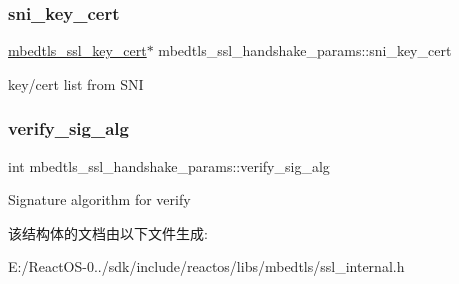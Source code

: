 \subsubsection{\texorpdfstring{sni\+\_\+key\+\_\+cert}{sni\_key\_cert}}
{\footnotesize\ttfamily \hyperlink{structmbedtls__ssl__key__cert}{mbedtls\+\_\+ssl\+\_\+key\+\_\+cert}$\ast$ mbedtls\+\_\+ssl\+\_\+handshake\+\_\+params\+::sni\+\_\+key\+\_\+cert}

key/cert list from S\+NI \mbox{\label{structmbedtls__ssl__handshake__params_ab950ce283cc477ea1a246689ecd2a22d}} 
\subsubsection{\texorpdfstring{verify\+\_\+sig\+\_\+alg}{verify\_sig\_alg}}
{\footnotesize\ttfamily int mbedtls\+\_\+ssl\+\_\+handshake\+\_\+params\+::verify\+\_\+sig\+\_\+alg}

Signature algorithm for verify 

该结构体的文档由以下文件生成\+:\begin{DoxyCompactItemize}
\item 
E\+:/\+React\+O\+S-\/0../sdk/include/reactos/libs/mbedtls/ssl\+\_\+internal.\+h\end{DoxyCompactItemize}
